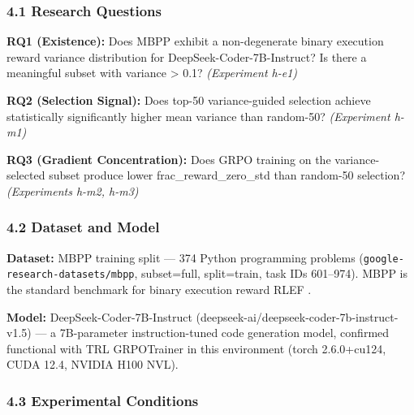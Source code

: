 
\subsubsection{4.1 Research Questions}

\textbf{RQ1 (Existence):} Does MBPP exhibit a non-degenerate binary execution reward variance distribution for DeepSeek-Coder-7B-Instruct? Is there a meaningful subset with variance > 0.1? \textit{(Experiment h-e1)}

\textbf{RQ2 (Selection Signal):} Does top-50 variance-guided selection achieve statistically significantly higher mean variance than random-50? \textit{(Experiment h-m1)}

\textbf{RQ3 (Gradient Concentration):} Does GRPO training on the variance-selected subset produce lower frac\_reward\_zero\_std than random-50 selection? \textit{(Experiments h-m2, h-m3)}

\subsubsection{4.2 Dataset and Model}

\textbf{Dataset:} MBPP training split \citep{Austin2021} --- 374 Python programming problems (\texttt{google-research-datasets/mbpp}, subset=full, split=train, task IDs 601--974). MBPP is the standard benchmark for binary execution reward RLEF \citep{Gehring2024}.

\textbf{Model:} DeepSeek-Coder-7B-Instruct (deepseek-ai/deepseek-coder-7b-instruct-v1.5) \citep{Shao2024DeepSeekMath} --- a 7B-parameter instruction-tuned code generation model, confirmed functional with TRL GRPOTrainer in this environment (torch 2.6.0+cu124, CUDA 12.4, NVIDIA H100 NVL).

\subsubsection{4.3 Experimental Conditions}

\begin{table}[htbp]
\centering
{}
\end{table}

